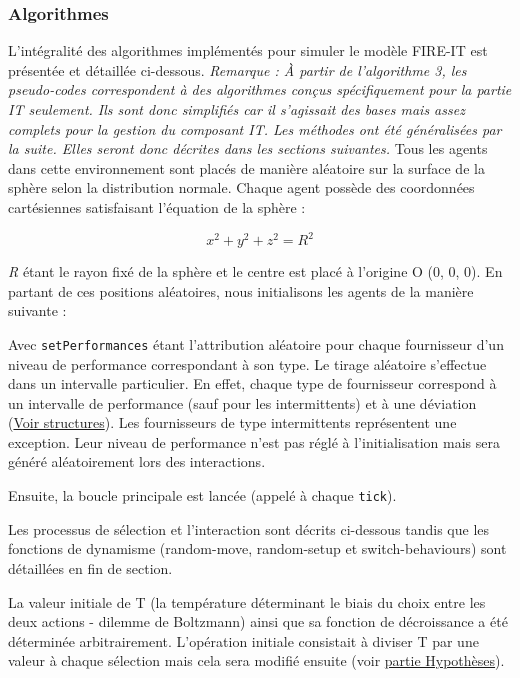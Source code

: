 \subsubsection{Algorithmes}
L'intégralité des algorithmes implémentés pour simuler le modèle FIRE-IT est présentée et détaillée ci-dessous. 
\textit{Remarque : À partir de l'algorithme 3, les pseudo-codes correspondent à des algorithmes conçus spécifiquement pour la partie IT seulement. Ils sont donc simplifiés car il s'agissait des bases mais assez complets pour la gestion du composant IT. Les méthodes ont été généralisées par la suite. Elles seront donc décrites dans les sections suivantes.}
\newline
Tous les agents dans cette environnement sont placés de manière aléatoire sur la surface de la sphère selon la distribution normale. Chaque agent possède des coordonnées cartésiennes satisfaisant l'équation de la sphère :

\[ x^2 + y^2 + z^2 = R^2 \]

\textit{R} étant le rayon fixé de la sphère et le centre est placé à l'origine O (0, 0, 0).
En partant de ces positions aléatoires, nous initialisons les agents de la manière suivante :


Avec \texttt{setPerformances} étant l'attribution aléatoire pour chaque fournisseur d'un niveau de performance correspondant à son type. Le tirage aléatoire s'effectue dans un intervalle particulier. En effet, chaque type de fournisseur correspond à un intervalle de performance (sauf pour les intermittents) et à une déviation (\hyperref[sec:structures]{Voir structures}). Les fournisseurs de type intermittents représentent une exception. Leur niveau de performance n'est pas réglé à l'initialisation mais sera généré aléatoirement lors des interactions.

Ensuite, la boucle principale est lancée (appelé à chaque \texttt{tick}). 
 
Les processus de sélection et l'interaction sont décrits ci-dessous tandis que les fonctions de dynamisme (random-move, random-setup et switch-behaviours) sont détaillées en fin de section.


La valeur initiale de T (la température déterminant le biais du choix entre les deux actions - dilemme de Boltzmann) ainsi que sa fonction de décroissance a été déterminée arbitrairement. L'opération initiale consistait à diviser T par une valeur à chaque sélection mais cela sera modifié ensuite (voir \hyperref[sec:temperature]{partie Hypothèses}). 

